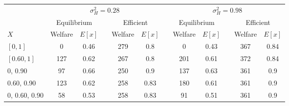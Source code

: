 \begin{tabular}{lccccccccccc}     & \multicolumn{5}{c}{$\sigma^2_H=0.28$}                              &  & \multicolumn{5}{c}{$\sigma^2_H=0.98$}                              \\ \cline{2-6} \cline{8-12}      & \multicolumn{2}{c}{Equilibrium} &  & \multicolumn{2}{c}{Efficient} &  & \multicolumn{2}{c}{Equilibrium} &  & \multicolumn{2}{c}{Efficient} \\ $X$ & Welfare         & $E[x]$        &  & Welfare        & $E[x]$       &  & Welfare         & $E[x]$        &  & Welfare        & $E[x]$       \\ $[0,1]$ & 0 & 0.46 &  & 279 & 0.8 &  & 0 & 0.43 &  & 367 & 0.84 \\ $[0.60,1]$ & 127 & 0.62 &  & 267 & 0.8 &  & 201 & 0.61 &  & 372 & 0.84 \\ 0, 0.90 & 97 & 0.66 &  & 250 & 0.9 &  & 137 & 0.63 &  & 361 & 0.9 \\ 0.60, 0.90 & 123 & 0.62 &  & 258 & 0.83 &  & 180 & 0.61 &  & 361 & 0.9 \\ 0, 0.60, 0.90 & 58 & 0.53 &  & 258 & 0.83 &  & 91 & 0.51 &  & 361 & 0.9\end{tabular}
